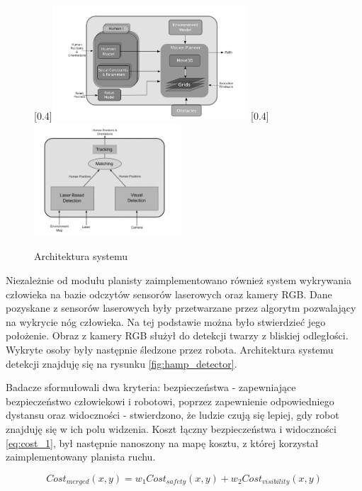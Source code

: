 \begin{figure}[H]
	\centering
	[0.4\linewidth]{\includegraphics[height=4.25cm]{gfx/HAMP_arch.png}}		
	[0.4\linewidth]{\includegraphics[height=4.25cm]{gfx/HAMP_detector.png}}		
	\caption{Architektura systemu}
	\label{fig:hamp_main}
\end{figure}


Niezależnie od modułu planisty zaimplementowano również system wykrywania człowieka na bazie odczytów sensorów laserowych oraz kamery RGB. Dane pozyskane z sensorów laserowych były przetwarzane przez algorytm pozwalający na wykrycie nóg człowieka. Na tej podstawie można było stwierdzieć jego położenie. Obraz z kamery RGB służył do detekcji twarzy z bliskiej odległości. Wykryte osoby były następnie śledzone przez robota. Architektura systemu detekcji znajduję się na rysunku \ref{fig:hamp_detector}.

Badacze sformułowali dwa kryteria: bezpieczeństwa - zapewniające bezpieczeństwo człowiekowi i robotowi, poprzez zapewnienie odpowiedniego dystansu oraz widoczności - stwierdzono, że ludzie czują się lepiej, gdy robot znajduję się w ich polu widzenia. Koszt łączny bezpieczeństwa i widoczności \ref{eq:cost_1}, był następnie nanoszony na mapę kosztu, z której korzystał zaimplementowany planista ruchu.


\begin{figure}[h!t]
  	\centering 
  	\begin{equation} \label{eq:cost_1}
  	Cost_{merged}(x,y) = w_{1}Cost_{safety}(x,y) + w_{2}Cost_{visibility}(x,y)
  	\end{equation}   
\end{figure}
    
    
    
